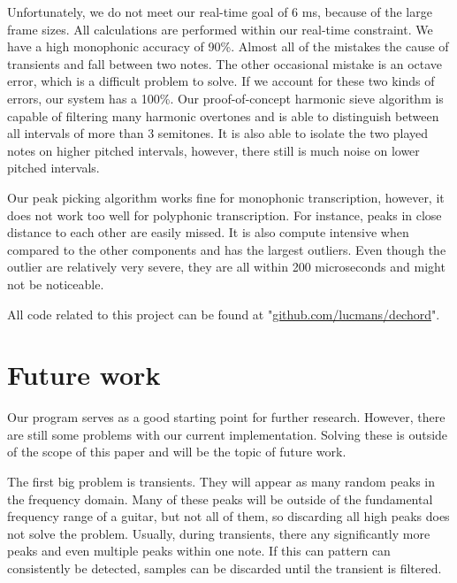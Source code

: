 \documentclass[10pt,twocolumn]{article}
\begin{document}
Unfortunately, we do not meet our real-time goal of 6 ms, because of the large frame sizes. All calculations are performed within our real-time constraint. We have a high monophonic accuracy of 90\%. Almost all of the mistakes the cause of transients and fall between two notes. The other occasional mistake is an octave error, which is a difficult problem to solve. If we account for these two kinds of errors, our system has a 100\%. Our proof-of-concept harmonic sieve algorithm is capable of filtering many harmonic overtones and is able to distinguish between all intervals of more than 3 semitones. It is also able to isolate the two played notes on higher pitched intervals, however, there still is much noise on lower pitched intervals.

Our peak picking algorithm works fine for monophonic transcription, however, it does not work too well for polyphonic transcription. For instance, peaks in close distance to each other are easily missed. It is also compute intensive when compared to the other components and has the largest outliers. Even though the outlier are relatively very severe, they are all within 200 microseconds and might not be noticeable.

All code related to this project can be found at "\url{github.com/lucmans/dechord}".


\section{Future work}  \label{sec:future}
Our program serves as a good starting point for further research. However, there are still some problems with our current implementation. Solving these is outside of the scope of this paper and will be the topic of future work.

The first big problem is transients. They will appear as many random peaks in the frequency domain. Many of these peaks will be outside of the fundamental frequency range of a guitar, but not all of them, so discarding all high peaks does not solve the problem. Usually, during transients, there any significantly more peaks and even multiple peaks within one note. If this can pattern can consistently be detected, samples can be discarded until the transient is filtered.
\end{document}
